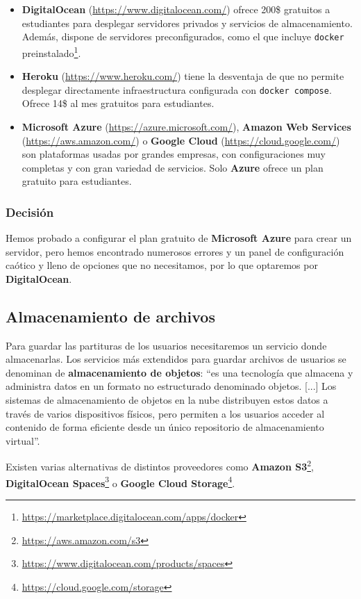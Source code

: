 \begin{itemize}
    \item \textbf{DigitalOcean} (\url{https://www.digitalocean.com/}) ofrece 200\$ gratuitos a estudiantes para desplegar servidores privados y servicios de almacenamiento. Además, dispone de servidores preconfigurados, como el que incluye \texttt{docker} preinstalado\footnote{\url{https://marketplace.digitalocean.com/apps/docker}}.
    \item \textbf{Heroku} (\url{https://www.heroku.com/}) tiene la desventaja de que no permite desplegar directamente infraestructura configurada con \texttt{docker compose}. Ofrece 14\$ al mes gratuitos para estudiantes.
    \item \textbf{Microsoft Azure} (\url{https://azure.microsoft.com/}), \textbf{Amazon Web Services} (\url{https://aws.amazon.com/}) o \textbf{Google Cloud} (\url{https://cloud.google.com/}) son plataformas usadas por grandes empresas, con configuraciones muy completas y con gran variedad de servicios. Solo \textbf{Azure} ofrece un plan gratuito para estudiantes.
\end{itemize}

\subsubsection{Decisión}

Hemos probado a configurar el plan gratuito de \textbf{Microsoft Azure} para crear un servidor, pero hemos encontrado numerosos errores y un panel de configuración caótico y lleno de opciones que no necesitamos, por lo que optaremos por \textbf{DigitalOcean}.


\subsection{Almacenamiento de archivos}

Para guardar las partituras de los usuarios necesitaremos un servicio donde almacenarlas. Los servicios más extendidos para guardar archivos de usuarios se denominan de \textbf{almacenamiento de objetos}: ``es una tecnología que almacena y administra datos en un formato no estructurado denominado objetos. [...] Los sistemas de almacenamiento de objetos en la nube distribuyen estos datos a través de varios dispositivos físicos, pero permiten a los usuarios acceder al contenido de forma eficiente desde un único repositorio de almacenamiento virtual''\cite{whatIsObjectStorage}.

Existen varias alternativas de distintos proveedores como \textbf{Amazon S3}\footnote{\url{https://aws.amazon.com/s3}}, \textbf{DigitalOcean Spaces}\footnote{\url{https://www.digitalocean.com/products/spaces}} o \textbf{Google Cloud Storage}\footnote{\url{https://cloud.google.com/storage}}.

